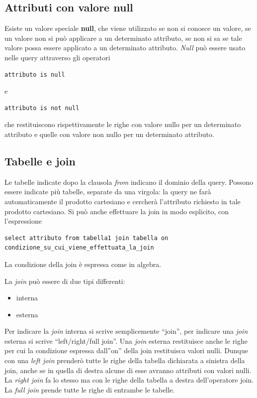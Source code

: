 \documentclass[\main/main.tex]{subfiles}
\begin{document}
\subsection{Attributi con valore null}
Esiste un valore speciale \textbf{null}, che viene utilizzato se non si conosce un valore, se un valore non si può applicare a un determinato attributo, se non si sa se tale valore possa essere applicato a un determinato attributo.
\textit{Null} può essere usato nelle query attraverso gli operatori
\begin{verbatim}
attributo is null
\end{verbatim}
e
\begin{verbatim}
attributo is not null
\end{verbatim}
che restituiscono rispettivamente le righe con valore nullo per un determinato attributo e quelle con valore non nullo per un determinato attributo.

\subsection{Tabelle e join}
Le tabelle indicate dopo la clausola \textit{from} indicano il dominio della query.
Possono essere indicate più tabelle, separate da una virgola: la query ne farà automaticamente il prodotto cartesiano e cercherà l'attributo richiesto in tale prodotto cartesiano.
Si può anche effettuare la join in modo esplicito, con l'espressione

\begin{verbatim}
select attributo from tabella1 join tabella on condizione_su_cui_viene_effettuata_la_join
\end{verbatim}
La condizione della join è espressa come in algebra.

La \textit{join} può essere di due tipi differenti:
\begin{itemize}
  \item interna
  \item esterna
\end{itemize}
Per indicare la \textit{join} interna si scrive semplicemente ``join'', per indicare una \textit{join} esterna si scrive ``left/right/full join''.
Una \textit{join} esterna restituisce anche le righe per cui la condizione espressa dall''on'' della join restituisca valori nulli.
Dunque con una \textit{left join} prenderò tutte le righe della tabella dichiarata a sinistra della join, anche se in quella di destra alcune di esse avranno attributi con valori nulli.
La \textit{right join} fa lo stesso ma con le righe della tabella a destra dell'operatore join.
La \textit{full join} prende tutte le righe di entrambe le tabelle.
\end{document}
